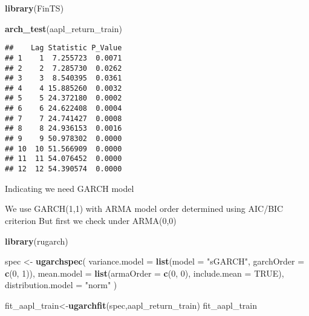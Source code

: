 \documentclass[
]{article}
\newenvironment{Shaded}{\begin{snugshade}}{\end{snugshade}}
\newcommand{\AttributeTok}[1]{\textcolor[rgb]{0.13,0.29,0.53}{#1}}
\newcommand{\ConstantTok}[1]{\textcolor[rgb]{0.56,0.35,0.01}{#1}}
\newcommand{\DecValTok}[1]{\textcolor[rgb]{0.00,0.00,0.81}{#1}}
\newcommand{\FunctionTok}[1]{\textcolor[rgb]{0.13,0.29,0.53}{\textbf{#1}}}
\newcommand{\NormalTok}[1]{#1}
\newcommand{\OtherTok}[1]{\textcolor[rgb]{0.56,0.35,0.01}{#1}}
\newcommand{\StringTok}[1]{\textcolor[rgb]{0.31,0.60,0.02}{#1}}
\begin{document}
\begin{Shaded}
\begin{Highlighting}[]
\FunctionTok{library}\NormalTok{(FinTS)}

  \FunctionTok{arch\_test}\NormalTok{(aapl\_return\_train)}
\end{Highlighting}
\end{Shaded}

\begin{verbatim}
##    Lag Statistic P_Value
## 1    1  7.255723  0.0071
## 2    2  7.285730  0.0262
## 3    3  8.540395  0.0361
## 4    4 15.885260  0.0032
## 5    5 24.372180  0.0002
## 6    6 24.622408  0.0004
## 7    7 24.741427  0.0008
## 8    8 24.936153  0.0016
## 9    9 50.978302  0.0000
## 10  10 51.566909  0.0000
## 11  11 54.076452  0.0000
## 12  12 54.390574  0.0000
\end{verbatim}

Indicating we need GARCH model

We use GARCH(1,1) with ARMA model order determined using AIC/BIC
criterion But first we check under ARMA(0,0)

\begin{Shaded}
\begin{Highlighting}[]
\FunctionTok{library}\NormalTok{(rugarch)}
\end{Highlighting}
\end{Shaded}

\begin{Shaded}
\begin{Highlighting}[]
\NormalTok{spec }\OtherTok{\textless{}{-}} \FunctionTok{ugarchspec}\NormalTok{(}
  \AttributeTok{variance.model =} \FunctionTok{list}\NormalTok{(}\AttributeTok{model =} \StringTok{"sGARCH"}\NormalTok{, }\AttributeTok{garchOrder =} \FunctionTok{c}\NormalTok{(}\DecValTok{0}\NormalTok{, }\DecValTok{1}\NormalTok{)),}
  \AttributeTok{mean.model =} \FunctionTok{list}\NormalTok{(}\AttributeTok{armaOrder =} \FunctionTok{c}\NormalTok{(}\DecValTok{0}\NormalTok{, }\DecValTok{0}\NormalTok{), }\AttributeTok{include.mean =} \ConstantTok{TRUE}\NormalTok{),}
  \AttributeTok{distribution.model =} \StringTok{"norm"}
\NormalTok{)}
\end{Highlighting}
\end{Shaded}

\begin{Shaded}
\begin{Highlighting}[]
\NormalTok{fit\_aapl\_train}\OtherTok{\textless{}{-}}\FunctionTok{ugarchfit}\NormalTok{(spec,aapl\_return\_train)}
\NormalTok{fit\_aapl\_train}
\end{Highlighting}
\end{Shaded}
\end{document}
